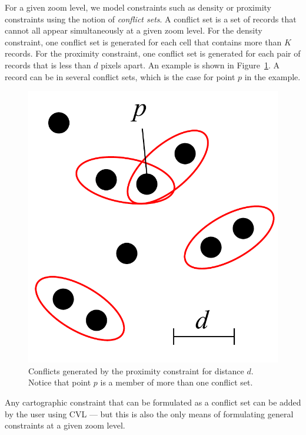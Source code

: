 For a given zoom level, we model constraints such as density or proximity constraints using the notion of \emph{conflict sets}. A conflict set is a set of records that cannot all appear simultaneously at a given zoom level. For the density constraint, one conflict set is generated for each cell that contains more than $K$ records. For the proximity constraint, one conflict set is generated for each pair of records that is less than $d$ pixels apart. An example is shown in Figure~\ref{fig:proximity:conflict}. A record can be in several conflict sets, which is the case for point $p$ in the example.

\begin{figure}[htbp]
\begin{center}
\includegraphics[scale=.3]{figs/cvl_proximity_conflicts.pdf}
\caption{Conflicts generated by the proximity constraint for distance $d$. Notice that point $p$ is a member of more than one conflict set.}
\label{fig:proximity:conflict}
\end{center}
\end{figure}

Any cartographic constraint that can be formulated as a conflict set can be added by the user using CVL --- but this is also the only means of formulating general constraints at a given zoom level. 

